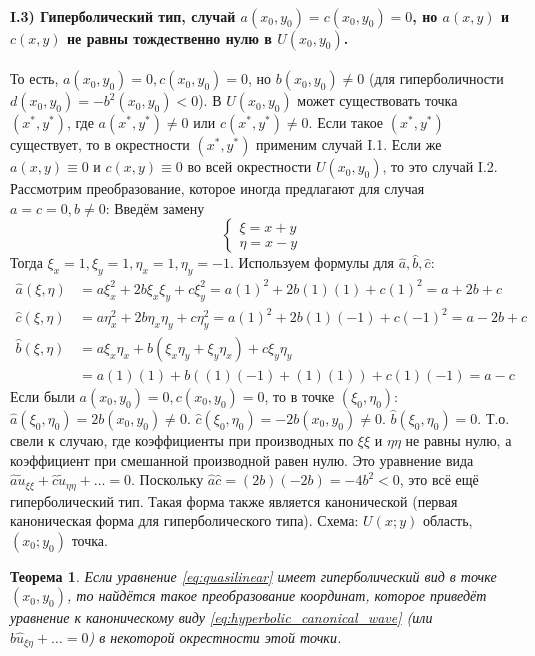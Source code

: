 \documentclass[12pt, a4paper]{article}
\newtheorem{theorem}{Теорема}[section] %
\begin{document}
\paragraph{I.3) Гиперболический тип, случай $a(x_0,y_0) = c(x_0,y_0) = 0$, но $a(x,y)$ и $c(x,y)$ не равны тождественно нулю в $U(x_0,y_0)$.}
То есть, $a(x_0,y_0)=0, c(x_0,y_0)=0$, но $b(x_0,y_0) \neq 0$ (для гиперболичности $d(x_0,y_0) = -b^2(x_0,y_0) < 0$).
В $U(x_0,y_0)$ может существовать точка $(x^*,y^*)$, где $a(x^*,y^*)\neq 0$ или $c(x^*,y^*)\neq 0$.
Если такое $(x^*,y^*)$ существует, то в окрестности $(x^*,y^*)$ применим случай I.1.
Если же $a(x,y)\equiv 0$ и $c(x,y)\equiv 0$ во всей окрестности $U(x_0,y_0)$, то это случай I.2.
Рассмотрим преобразование, которое иногда предлагают для случая $a=c=0, b \neq 0$:
Введём замену
\[
\begin{cases}
\xi = x+y \\
\eta = x-y
\end{cases}
\]
Тогда $\xi_x=1, \xi_y=1, \eta_x=1, \eta_y=-1$.
Используем формулы для $\hat{a}, \hat{b}, \hat{c}$:
\begin{align*}
\hat{a}(\xi,\eta) &= a\xi_x^2 + 2b\xi_x\xi_y + c\xi_y^2 = a(1)^2 + 2b(1)(1) + c(1)^2 = a+2b+c \\
\hat{c}(\xi,\eta) &= a\eta_x^2 + 2b\eta_x\eta_y + c\eta_y^2 = a(1)^2 + 2b(1)(-1) + c(-1)^2 = a-2b+c \\
\hat{b}(\xi,\eta) &= a\xi_x\eta_x + b(\xi_x\eta_y + \xi_y\eta_x) + c\xi_y\eta_y \\
                 &= a(1)(1) + b((1)(-1) + (1)(1)) + c(1)(-1) = a - c
\end{align*}
Если были $a(x_0,y_0)=0, c(x_0,y_0)=0$, то в точке $(\xi_0,\eta_0)$:
$\hat{a}(\xi_0,\eta_0) = 2b(x_0,y_0) \neq 0$.
$\hat{c}(\xi_0,\eta_0) = -2b(x_0,y_0) \neq 0$.
$\hat{b}(\xi_0,\eta_0) = 0$.
Т.о. свели к случаю, где коэффициенты при производных по $\xi\xi$ и $\eta\eta$ не равны нулю, а коэффициент при смешанной производной равен нулю. Это уравнение вида $\hat{a}\tilde{u}_{\xi\xi} + \hat{c}\tilde{u}_{\eta\eta} + \dots = 0$.
Поскольку $\hat{a}\hat{c} = (2b)(-2b) = -4b^2 < 0$, это всё ещё гиперболический тип.
Такая форма также является канонической (первая каноническая форма для гиперболического типа).
Схема: $U(x;y)$ область, $(x_0;y_0)$ точка.

\begin{theorem}
Если уравнение \eqref{eq:quasilinear} имеет гиперболический вид в точке $(x_0,y_0)$, то найдётся такое преобразование координат, которое приведёт уравнение к каноническому виду \eqref{eq:hyperbolic_canonical_wave} (или $\hat{b}\hat{u}_{\xi\eta}+\dots=0$) в некоторой окрестности этой точки.
\end{theorem}
\end{document}
